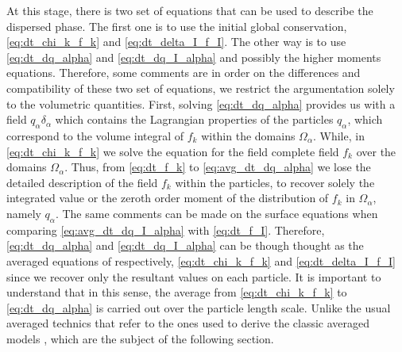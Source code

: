 At this stage, there is two set of equations that can be used to describe the dispersed phase. 
The first one is to use the initial global conservation, \ref{eq:dt_chi_k_f_k} and \ref{eq:dt_delta_I_f_I}. 
The other way is to use \ref{eq:dt_dq_alpha} and \ref{eq:dt_dq_I_alpha} and possibly the higher moments equations.
Therefore, some comments are in order on the differences and compatibility of these two set of equations, we restrict the argumentation solely to the volumetric quantities.
First, solving \ref{eq:dt_dq_alpha} provides us with a field $q_\alpha\delta_\alpha$ which contains the Lagrangian properties of the particles $q_\alpha$, which correspond to the volume integral of $f_k$ within the domains $\Omega_\alpha$.
While, in \ref{eq:dt_chi_k_f_k} we solve the equation for the field complete field $f_k$ over the domains $\Omega_\alpha$.  
Thus, from  \ref{eq:dt_f_k} to \ref{eq:avg_dt_dq_alpha} we lose the detailed description of the field $f_k$ within the particles, to recover solely the integrated value or the zeroth order moment of the distribution of $f_k$ in $\Omega_\alpha$, namely $q_\alpha$. 
The same comments can be made on the surface equations when comparing \ref{eq:avg_dt_dq_I_alpha} with \ref{eq:dt_f_I}. 
Therefore, \ref{eq:dt_dq_alpha} and \ref{eq:dt_dq_I_alpha} can be though \JL{}thought as the averaged equations of respectively, \ref{eq:dt_chi_k_f_k} and  \ref{eq:dt_delta_I_f_I} since we recover only the resultant values on each particle. 
It is important to understand that in this sense, the average from \ref{eq:dt_chi_k_f_k} to \ref{eq:dt_dq_alpha} is carried out over the particle length scale.
Unlike the usual averaged technics that refer to the ones used to derive the classic averaged models \citep{jackson1997locally,zhang1994averaged}, which are the subject of the following section. 


